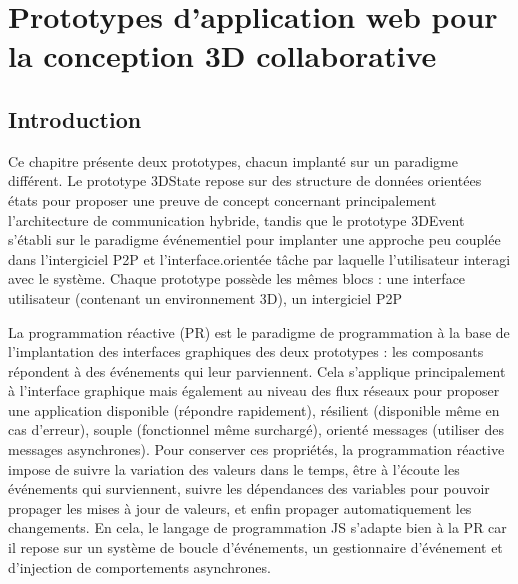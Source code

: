 \chapter{Prototypes d'application web pour la conception 3D collaborative}
\chaptertable

\section{Introduction}
Ce chapitre présente deux prototypes, chacun implanté sur un paradigme différent.
Le prototype 3DState repose sur des structure de données orientées états pour 
proposer une preuve de concept concernant principalement l'architecture de 
communication hybride, tandis que le prototype 3DEvent s'établi sur le paradigme 
événementiel pour implanter une approche peu couplée dans l'intergiciel \gls{P2P} 
et l'interface.orientée tâche par laquelle l'utilisateur interagi avec le système.
Chaque prototype possède les mêmes blocs : une interface utilisateur (contenant 
un environnement 3D), un intergiciel \gls{P2P} 



La programmation réactive (PR) est le paradigme de programmation à la base de 
l'implantation des interfaces graphiques des deux prototypes : les composants 
répondent à des événements qui leur parviennent. 
Cela s'applique principalement à l'interface graphique mais 
également au niveau des flux réseaux pour proposer une application disponible 
(répondre rapidement), résilient (disponible même en cas d'erreur), souple 
(fonctionnel même surchargé), orienté messages (utiliser des messages 
asynchrones). Pour conserver ces propriétés, la programmation réactive impose 
de suivre la variation des valeurs dans le temps, être à l'écoute les événements 
qui surviennent, suivre les dépendances des variables pour pouvoir propager les 
mises à jour de valeurs, et enfin propager automatiquement les changements.
En cela, le langage de programmation \gls{JS} s'adapte bien à la PR car il repose 
sur un système de boucle d'événements, un gestionnaire d'événement et 
d'injection de comportements asynchrones. 


